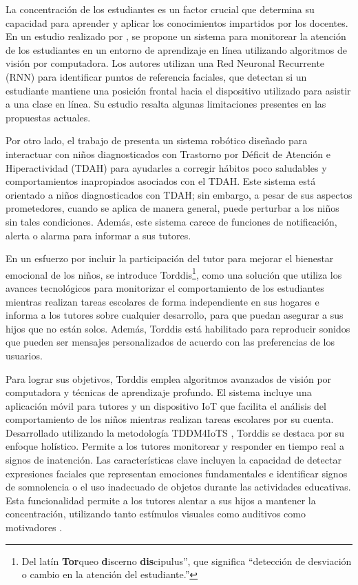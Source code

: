 \documentclass[a4paper,fleqn]{cas-sc}
\begin{document}
	La concentración de los estudiantes es un factor crucial que determina su capacidad para aprender y aplicar los conocimientos impartidos por los docentes. En un estudio realizado por \cite{Terraza2022}, se propone un sistema para monitorear la atención de los estudiantes en un entorno de aprendizaje en línea utilizando algoritmos de visión por computadora. Los autores utilizan una Red Neuronal Recurrente (RNN) para identificar puntos de referencia faciales, que detectan si un estudiante mantiene una posición frontal hacia el dispositivo utilizado para asistir a una clase en línea. Su estudio resalta algunas limitaciones presentes en las propuestas actuales.
	
	Por otro lado, el trabajo de \cite{Berrezueta-Guzman2021} presenta un sistema robótico diseñado para interactuar con niños diagnosticados con Trastorno por Déficit de Atención e Hiperactividad (TDAH) para ayudarles a corregir hábitos poco saludables y comportamientos inapropiados asociados con el TDAH. Este sistema está orientado a niños diagnosticados con TDAH; sin embargo, a pesar de sus aspectos prometedores, cuando se aplica de manera general, puede perturbar a los niños sin tales condiciones. Además, este sistema carece de funciones de notificación, alerta o alarma para informar a sus tutores.
	
	En un esfuerzo por incluir la participación del tutor para mejorar el bienestar emocional de los niños, se introduce Torddis\footnote{Del latín \textbf{Tor}queo \textbf{d}iscerno \textbf{dis}cipulus'', que significa ``detección de desviación o cambio en la atención del estudiante.''}, como una solución que utiliza los avances tecnológicos para monitorizar el comportamiento de los estudiantes mientras realizan tareas escolares de forma independiente en sus hogares e informa a los tutores sobre cualquier desarrollo, para que puedan asegurar a sus hijos que no están solos. Además, Torddis está habilitado para reproducir sonidos que pueden ser mensajes personalizados de acuerdo con las preferencias de los usuarios.
	
	Para lograr sus objetivos, Torddis emplea algoritmos avanzados de visión por computadora y técnicas de aprendizaje profundo. El sistema incluye una aplicación móvil para tutores y un dispositivo IoT que facilita el análisis del comportamiento de los niños mientras realizan tareas escolares por su cuenta. Desarrollado utilizando la metodología TDDM4IoTS \citep{Guerrero-Ulloa2020TDDM4IoTS}, Torddis se destaca por su enfoque holístico. Permite a los tutores monitorear y responder en tiempo real a signos de inatención. Las características clave incluyen la capacidad de detectar expresiones faciales que representan emociones fundamentales e identificar signos de somnolencia o el uso inadecuado de objetos durante las actividades educativas. Esta funcionalidad permite a los tutores alentar a sus hijos a mantener la concentración, utilizando tanto estímulos visuales como auditivos como motivadores \citep{Al-Gburi2023,Enadula2021,Terraza2022}.
	
\end{document}

